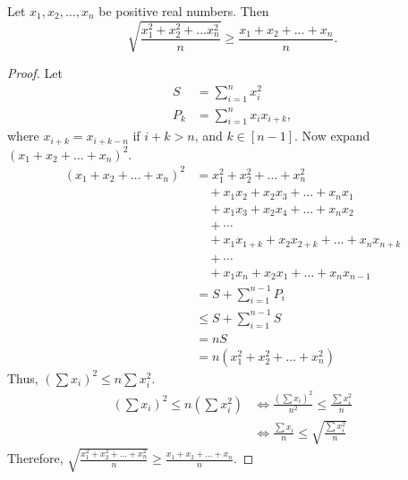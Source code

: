 \documentclass[../main.tex]{subfiles}
\begin{document}
\begin{prop} \label{prop:rms-am}
    Let $x_1, x_2, \dots, x_n$ be positive real numbers.
    Then
    \[
        \sqrt{\frac{x_1^2 + x_2^2 + \dots x_n^2}{n}} \geq \frac{x_1 + x_2 + \dots + x_n}{n}.
    \]
\end{prop}
\begin{proof}
    Let 
    \begin{align*}
        S &= \sum_{i=1}^n x_i^2\\
        P_k &= \sum_{i=1}^{n} x_i x_{i+k},
    \end{align*}
    where $x_{i+k} = x_{i+k-n}$ if $i + k > n$, and $k \in [n-1]$.
    Now expand $(x_1 + x_2 + \dots + x_n)^2$.
    \begin{align*}
        (x_1 + x_2 + \dots + x_n)^2 &= x_1^2 + x_2^2 + \dots + x_n^2\\
                                    &\quad + x_1 x_2 + x_2 x_3 + \dots + x_n x_1\\
                                    &\quad + x_1 x_3 + x_2 x_4 + \dots + x_n x_2\\
                                    &\quad + \cdots\\
                                    &\quad + x_1 x_{1+k} + x_2 x_{2+k} + \dots + x_n x_{n+k}\\
                                    &\quad + \cdots\\
                                    &\quad + x_1 x_n + x_2 x_1 + \dots + x_n x_{n-1}\\
                                    &= S + \sum_{i=1}^{n-1} P_i\\
                                    &\leq S + \sum_{i=1}^{n-1} S\\
                                    &= nS\\
                                    &= n(x_1^2 + x_2^2 + \dots + x_n^2)
    \end{align*}
    Thus, $\left( \sum x_i \right)^2 \leq n \sum x_i^2$.
    \begin{align*}
        \left( \sum x_i\right)^2 \leq n \left( \sum x_i^2\right) &\Leftrightarrow \frac{\left( \sum x_i \right)^2}{n^2} \leq \frac{\sum x_i^2}{n}\\
                                                                 &\Leftrightarrow \frac{\sum x_i}{n} \leq \sqrt{\frac{\sum x_i^2}{n}}
    \end{align*}
    Therefore, $\sqrt{\frac{x_1^2 + x_2^2 + \dots + x_n^2}{n}} \geq \frac{x_1 + x_2 + \dots + x_n}{n}$.
\end{proof}
\end{document}
